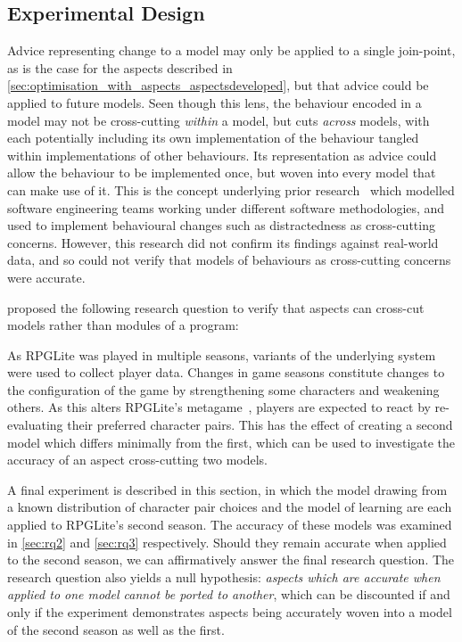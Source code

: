 \subsection{Experimental Design}

Advice representing change to a model may only be applied to a single
join-point, as is the case for the aspects described in
\cref{sec:optimisation_with_aspects_aspectsdeveloped}, but that advice could be
applied to future models. Seen though this lens, the behaviour encoded in a
model may not be cross-cutting \emph{within} a model, but cuts \emph{across}
models, with each potentially including its own implementation of the behaviour
tangled within implementations of other behaviours. Its representation as advice
could allow the behaviour to be implemented once, but woven into every model
that can make use of it. This is the concept underlying prior
research~\cite{wallis2018caise} which modelled software engineering teams
working under different software methodologies, and used \aop{} to implement
behavioural changes such as distractedness as cross-cutting concerns. However,
this research did not confirm its findings against real-world data, and so could
not verify that models of behaviours as cross-cutting concerns were accurate.

 proposed the following research question to verify that
aspects can cross-cut models rather than modules of a program:

\begin{researchquestion}
  \rqthree{}
\end{researchquestion}

As RPGLite was played in multiple seasons, variants of the underlying system
were used to collect player data. Changes in game seasons constitute changes to
the configuration of the game by strengthening some characters and weakening
others. As this alters RPGLite's metagame~\cite{kavanagh2021thesis}, players are
expected to react by re-evaluating their preferred character pairs. This has the
effect of creating a second model which differs minimally from the first, which
can be used to investigate the accuracy of an aspect cross-cutting two models.

A final experiment is described in this section, in which the model drawing from
a known distribution of character pair choices and the model of learning are
each applied to RPGLite's second season. The accuracy of these models was
examined in \cref{sec:rq2} and \cref{sec:rq3} respectively. Should they remain
accurate when applied to the second season, we can affirmatively answer the
final research question. The research question also yields a null hypothesis:
\emph{aspects which are accurate when applied to one model cannot be ported to
another}, which can be discounted if and only if the experiment
demonstrates aspects being accurately woven into a model of the second season as
well as the first. 

